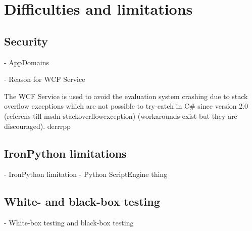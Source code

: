 \section{Difficulties and limitations}

\subsection{Security}

- AppDomains


- Reason for WCF Service


The WCF Service is used to avoid the evaluation system crashing due to stack overflow exceptions which are not possible to try-catch in C\# since version 2.0 (referens  till msdn stackoverflowexception) (workarounds exist but they are discouraged). derrrpp


\subsection{IronPython limitations}

- IronPython limitation
- Python ScriptEngine thing

\subsection{White- and black-box testing}

- White-box testing and black-box testing


